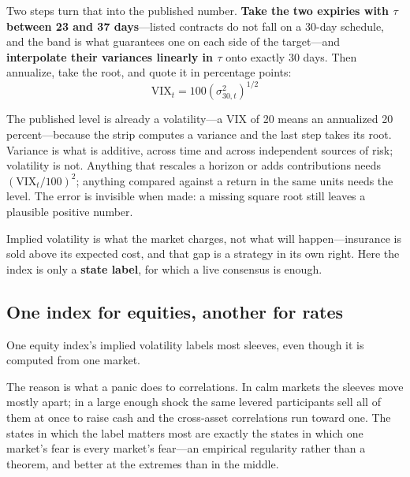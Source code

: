 Two steps turn that into the published number. \textbf{Take the two expiries with $\tau$ between 23
and 37 days}---listed contracts do not fall on a 30-day schedule, and the band is what guarantees
one on each side of the target---and \textbf{interpolate their variances linearly in $\tau$} onto
exactly 30 days. Then annualize, take the root, and quote it in percentage points:
\[
  \mathrm{VIX}_t = 100 \left( \sigma^2_{30,t} \right)^{1/2}
\]

\begin{note}
The published level is already a volatility---a VIX of 20 means an annualized 20 percent---because
the strip computes a variance and the last step takes its root. Variance is what is additive, across
time and across independent sources of risk; volatility is not. Anything that rescales a horizon or
adds contributions needs $\left( \mathrm{VIX}_t / 100 \right)^2$; anything compared against a return
in the same units needs the level. The error is invisible when made: a missing square root still
leaves a plausible positive number.
\end{note}

\begin{note}
Implied volatility is what the market charges, not what will happen---insurance is sold above its
expected cost, and that gap is a strategy in its own right. Here the index is only a \textbf{state
label}, for which a live consensus is enough.
\end{note}

\subsection{One index for equities, another for rates}\label{sec:two-indices}

\begin{claim}\label{clm:one-index}
One equity index's implied volatility labels most sleeves, even though it is computed from one
market.
\end{claim}

The reason is what a panic does to correlations. In calm markets the sleeves move mostly apart; in a
large enough shock the same levered participants sell all of them at once to raise cash and the
cross-asset correlations run toward one. The states in which the label matters most are exactly the
states in which one market's fear is every market's fear---an empirical regularity rather than a
theorem, and better at the extremes than in the middle.

